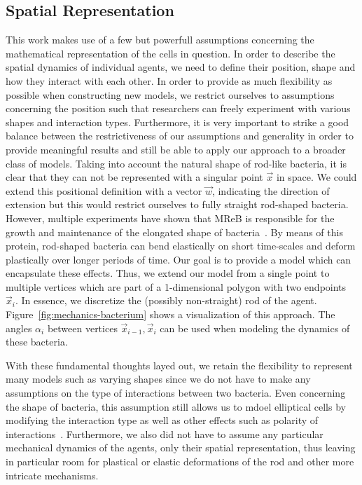 \documentclass{article}
\begin{document}
\subsection{Spatial Representation}
\label{subsec:spatial-representation}
This work makes use of a few but powerfull assumptions concerning the mathematical representation of
the cells in question.
In order to describe the spatial dynamics of individual agents, we need to define their position,
shape and how they interact with each other.
In order to provide as much flexibility as possible when constructing new models, we restrict
ourselves to assumptions concerning the position such that researchers can freely experiment with
various shapes and interaction types.
Furthermore, it is very important to strike a good balance between the restrictiveness of our
assumptions and generality in order to provide meaningful results and still be able to apply our
approach to a broader class of models.
Taking into account the natural shape of rod-like bacteria, it is clear that they can not be
represented with a singular point $\vec{x}$ in space.
We could extend this positional definition with a vector $\vec{w}$, indicating the direction of
extension but this would restrict ourselves to fully straight rod-shaped bacteria.
However, multiple experiments have shown that MReB is responsible for the growth and maintenance of
the elongated shape of bacteria~\cite{Erickson2001}.
By means of this protein, rod-shaped bacteria can bend elastically on short time-scales and
deform plastically over longer periods of time.
Our goal is to provide a model which can encapsulate these effects.
Thus, we extend our model from a single point to multiple vertices which are part of a 1-dimensional
polygon with two endpoints $\vec{x}_i$.
In essence, we discretize the (possibly non-straight) rod of the agent.
Figure~\ref{fig:mechanics-bacterium} shows a visualization of this approach.
The angles $\alpha_i$ between vertices $\vec{x}_{i-1},\vec{x}_i$ can be used when modeling the
dynamics of these bacteria.

With these fundamental thoughts layed out, we retain the flexibility to represent many models such
as varying shapes since we do not have to make any assumptions on the type of interactions between
two bacteria.
Even concerning the shape of bacteria, this assumption still allows us to mdoel elliptical cells by
modifying the interaction type as well as other effects such as polarity of
interactions~\cite{Duvernoy2018}.
Furthermore, we also did not have to assume any particular mechanical dynamics of the agents, only
their spatial representation, thus leaving in particular room for plastical or elastic deformations
of the rod and other more intricate mechanisms.
\end{document}
